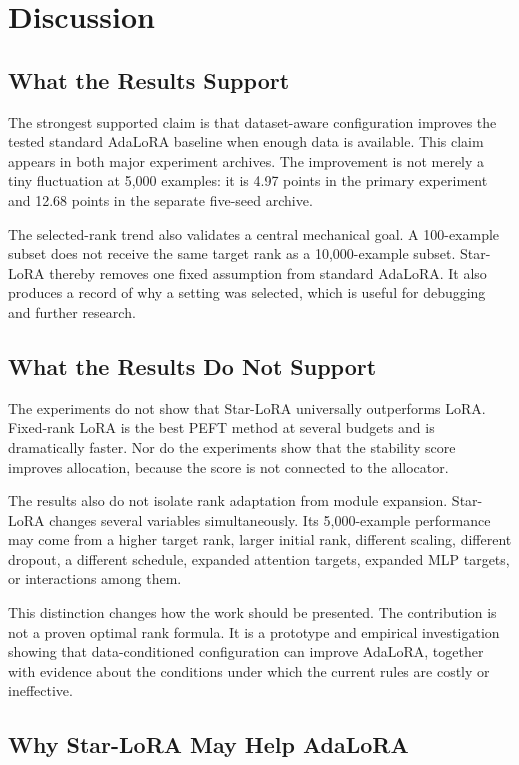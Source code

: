 \chapter{Discussion}
\label{chap:discussion}

\section{What the Results Support}

The strongest supported claim is that dataset-aware configuration improves the tested standard
AdaLoRA baseline when enough data is available. This claim appears in both major experiment
archives. The improvement is not merely a tiny fluctuation at 5,000 examples: it is 4.97 points in
the primary experiment and 12.68 points in the separate five-seed archive.

The selected-rank trend also validates a central mechanical goal. A 100-example subset does not
receive the same target rank as a 10,000-example subset. Star-LoRA thereby removes one fixed
assumption from standard AdaLoRA. It also produces a record of why a setting was selected, which
is useful for debugging and further research.

\section{What the Results Do Not Support}

The experiments do not show that Star-LoRA universally outperforms LoRA. Fixed-rank LoRA is the
best PEFT method at several budgets and is dramatically faster. Nor do the experiments show that
the stability score improves allocation, because the score is not connected to the allocator.

The results also do not isolate rank adaptation from module expansion. Star-LoRA changes several
variables simultaneously. Its 5,000-example performance may come from a higher target rank, larger
initial rank, different scaling, different dropout, a different schedule, expanded attention
targets, expanded MLP targets, or interactions among them.

This distinction changes how the work should be presented. The contribution is not a proven
optimal rank formula. It is a prototype and empirical investigation showing that data-conditioned
configuration can improve AdaLoRA, together with evidence about the conditions under which the
current rules are costly or ineffective.

\section{Why Star-LoRA May Help AdaLoRA}


